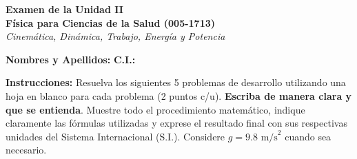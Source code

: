 \documentclass[12pt,letterpaper]{article}
\begin{document}
\begin{center}
    \textbf{\Large Examen de la Unidad II}\\
    \vspace{0.2cm}
    \textbf{Física para Ciencias de la Salud (005-1713)}\\
    \vspace{0.2cm}
    \textit{Cinemática, Dinámica, Trabajo, Energía y Potencia}
\end{center}

\vspace{0.5cm}
\noindent\textbf{Nombres y Apellidos:} \underline{\hspace{6cm}} \quad \textbf{C.I.:} \underline{\hspace{4cm}}
\vspace{0.5cm}

\noindent \textbf{Instrucciones:} Resuelva los siguientes 5 problemas de desarrollo utilizando una hoja en blanco para cada problema (2 puntos c/u). \textbf{Escriba de manera clara y que se entienda}. Muestre todo el procedimiento matemático, indique claramente las fórmulas utilizadas y exprese el resultado final con sus respectivas unidades del Sistema Internacional (S.I.). Considere $g = 9.8 \text{ m/s}^2$ cuando sea necesario.

\vspace{0.5cm}
\end{document}
